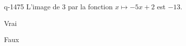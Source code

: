 \begin{truefalse}{q-1475}
L'image de $3$ par la fonction $x\mapsto -5x+2$ est $-13$.
\item* Vrai
\item Faux
\end{truefalse}

